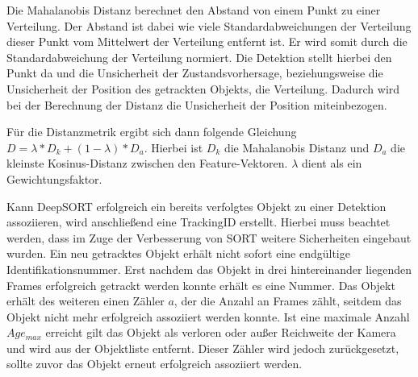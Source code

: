\documentclass[conference]{IEEEtran}
\begin{document}
	Die Mahalanobis Distanz berechnet den Abstand von einem Punkt zu einer Verteilung. Der Abstand ist dabei wie viele Standardabweichungen der Verteilung dieser Punkt vom Mittelwert der Verteilung entfernt ist. Er wird somit durch die Standardabweichung der Verteilung normiert. Die Detektion stellt hierbei den Punkt da und die Unsicherheit der Zustandsvorhersage, beziehungsweise die Unsicherheit der Position des getrackten Objekts, die Verteilung. Dadurch wird bei der Berechnung der Distanz die Unsicherheit der Position miteinbezogen.
	
	Für die Distanzmetrik ergibt sich dann folgende Gleichung
	$D = \lambda * D_k + (1-\lambda) * D_a$. Hierbei ist $D_k$ die Mahalanobis Distanz und $D_a$ die kleinste Kosinus-Distanz zwischen den Feature-Vektoren. $\lambda$ dient als ein Gewichtungsfaktor.
	
	Kann DeepSORT erfolgreich ein bereits verfolgtes Objekt zu einer Detektion assoziieren, wird anschließend eine TrackingID erstellt. Hierbei muss beachtet werden, dass im Zuge der Verbesserung von SORT weitere Sicherheiten eingebaut wurden. Ein neu getracktes Objekt erhält nicht sofort eine endgültige Identifikationsnummer. Erst nachdem das Objekt in drei hintereinander liegenden Frames erfolgreich getrackt werden konnte erhält es eine Nummer. Das Objekt erhält des weiteren einen Zähler $a$, der die Anzahl an Frames zählt, seitdem das Objekt nicht mehr erfolgreich assoziiert werden konnte. Ist eine maximale Anzahl $Age_{max}$ erreicht gilt das Objekt als verloren oder außer Reichweite der Kamera und wird aus der Objektliste entfernt. Dieser Zähler wird jedoch zurückgesetzt, sollte zuvor das Objekt erneut erfolgreich assoziiert werden.
	
\end{document}
